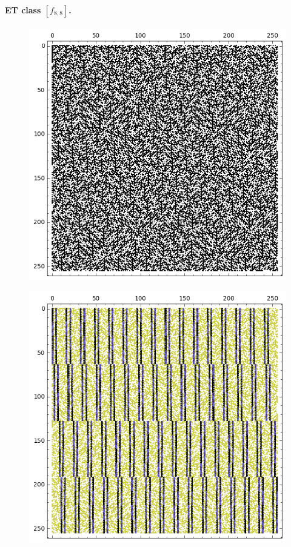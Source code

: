 \documentclass[12pt,a4paper]{article}
\begin{document}
\paragraph*{ET class $[f_{8,8}]$.}
\begin{figure}[!hb]
\centering
\begin{minipage}{.48\textwidth}
  \centering
  \includegraphics[width=.9\linewidth]{../matrix_plot/re8_8_weight_class_matrix.png}
  \label{fig:8_8_weight_class_matrix}
\end{minipage}%
\begin{minipage}{.48\textwidth}
  \centering
  \includegraphics[width=.9\linewidth]{../matrix_plot/re8_8_bent_cayley_graph_index_matrix.png}
  \label{fig:8_8_bent_cayley_graph_index_matrix}
\end{minipage}
\end{figure}
~
\end{document}
